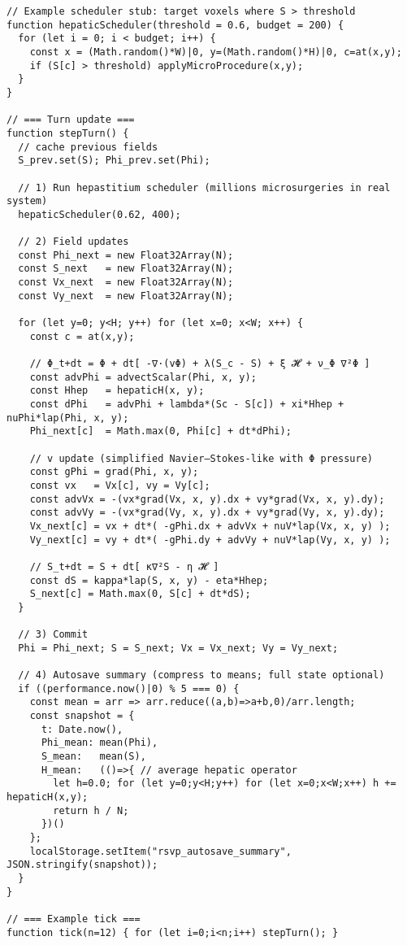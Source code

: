 \documentclass[12pt]{article}
\begin{document}
\begin{verbatim}
// Example scheduler stub: target voxels where S > threshold
function hepaticScheduler(threshold = 0.6, budget = 200) {
  for (let i = 0; i < budget; i++) {
    const x = (Math.random()*W)|0, y=(Math.random()*H)|0, c=at(x,y);
    if (S[c] > threshold) applyMicroProcedure(x,y);
  }
}

// === Turn update ===
function stepTurn() {
  // cache previous fields
  S_prev.set(S); Phi_prev.set(Phi);

  // 1) Run hepastitium scheduler (millions microsurgeries in real system)
  hepaticScheduler(0.62, 400);

  // 2) Field updates
  const Phi_next = new Float32Array(N);
  const S_next   = new Float32Array(N);
  const Vx_next  = new Float32Array(N);
  const Vy_next  = new Float32Array(N);

  for (let y=0; y<H; y++) for (let x=0; x<W; x++) {
    const c = at(x,y);

    // Φ_t+dt = Φ + dt[ -∇·(vΦ) + λ(S_c - S) + ξ 𝓗 + ν_Φ ∇²Φ ]
    const advPhi = advectScalar(Phi, x, y);
    const Hhep   = hepaticH(x, y);
    const dPhi   = advPhi + lambda*(Sc - S[c]) + xi*Hhep + nuPhi*lap(Phi, x, y);
    Phi_next[c]  = Math.max(0, Phi[c] + dt*dPhi);

    // v update (simplified Navier–Stokes-like with Φ pressure)
    const gPhi = grad(Phi, x, y);
    const vx   = Vx[c], vy = Vy[c];
    const advVx = -(vx*grad(Vx, x, y).dx + vy*grad(Vx, x, y).dy);
    const advVy = -(vx*grad(Vy, x, y).dx + vy*grad(Vy, x, y).dy);
    Vx_next[c] = vx + dt*( -gPhi.dx + advVx + nuV*lap(Vx, x, y) );
    Vy_next[c] = vy + dt*( -gPhi.dy + advVy + nuV*lap(Vy, x, y) );

    // S_t+dt = S + dt[ κ∇²S - η 𝓗 ]
    const dS = kappa*lap(S, x, y) - eta*Hhep;
    S_next[c] = Math.max(0, S[c] + dt*dS);
  }

  // 3) Commit
  Phi = Phi_next; S = S_next; Vx = Vx_next; Vy = Vy_next;

  // 4) Autosave summary (compress to means; full state optional)
  if ((performance.now()|0) % 5 === 0) {
    const mean = arr => arr.reduce((a,b)=>a+b,0)/arr.length;
    const snapshot = {
      t: Date.now(),
      Phi_mean: mean(Phi),
      S_mean:   mean(S),
      H_mean:   (()=>{ // average hepatic operator
        let h=0.0; for (let y=0;y<H;y++) for (let x=0;x<W;x++) h += hepaticH(x,y);
        return h / N;
      })()
    };
    localStorage.setItem("rsvp_autosave_summary", JSON.stringify(snapshot));
  }
}

// === Example tick ===
function tick(n=12) { for (let i=0;i<n;i++) stepTurn(); }
\end{verbatim}
\end{document}
